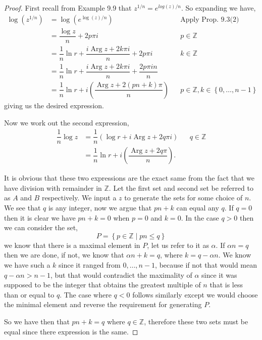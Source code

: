 \documentclass[11pt]{article}
\newcommand{\zz}{\mathbb Z}   %
\newcommand{\set}[1]{\left\{#1\right\}} %
\newcommand{\parg}{\operatorname{Arg}}
\renewcommand{\leq}{\leqslant}
\newcommand{\lrp}[1]{\left(#1\right)}
\newcommand{\lrc}[1]{\left\{#1\right\}}
\begin{document}
\begin{proof}
    First recall from Example 9.9 that $z^{1/n} = e^{log(z)/n}$. So expanding we have,
    \begin{align*}
        \log(z^{1/n}) &= \log(e^{\log(z) / n}) && \text{Apply Prop. 9.3(2)} \\
        &= \dfrac{\log z}{n } + 2p\pi i  && p\in \zz \\
        &= \dfrac{1}{n}\ln r + \dfrac{i \parg z + 2k\pi i }{n} + 2p\pi i  && k\in \zz \\
        &= \dfrac{1}{n}\ln r + \dfrac{i\parg z + 2k\pi i }{n} + \dfrac{2p \pi i n}{n} \\
        &= \dfrac{1}{n}\ln r + i\lrp{\dfrac{\parg z + 2(pn + k) \pi}{n}} && p\in \zz, k\in \lrc{0, \dots , n-1}
    \end{align*}
    giving us the desired expression. 

    Now we work out the second expression,
    \begin{align*}
      \dfrac{1}{n}\log z &= \dfrac{1}{n} \lrp{\log r + i \parg z + 2q \pi i }  && q \in \zz\\
      &= \dfrac{1}{n}\ln r + i\lrp{\dfrac{\parg z + 2q\pi}{n}}.
    \end{align*}

    It is obvious that these two expressions are the exact same from the fact that we have division with remainder in $\zz$. Let the first set and second set be referred to as $A$ and $B$ respectively. We input a $z$ to generate the sets for some choice of $n$. We see that $q$ is any integer, now we argue that $pn +k$ can equal any $q$. If $q = 0$ then it is clear we have $pn + k = 0$ when  $p = 0$ and $k = 0$. In the case $q > 0$ then we can consider the set,
    \[P = \set{p\in \zz \mid pn \leq q}\] 
    we know that there is a maximal element in $P$, let us refer to it as $\alpha$. If $\alpha n = q$ then we are done, if not, we know that $\alpha n + k = q$, where $k = q- \alpha n  $. We know we have such a $k$ since it ranged from $0, \dots, n-1$, because if not that would mean $q -\alpha n > n-1$, but that would contradict the maximality of $\alpha$ since it was supposed to be the integer that obtains the greatest multiple of $n$ that is less than or equal to $q$. The case where $q < 0$ follows similarly except we would choose the minimal element and reverse the requirement for generating $P$. 
    
    So we have then that $pn + k = q$ where $q \in \zz$, therefore these two sets must be equal since there expression is the same. 
    
    

\end{proof}
\end{document}
